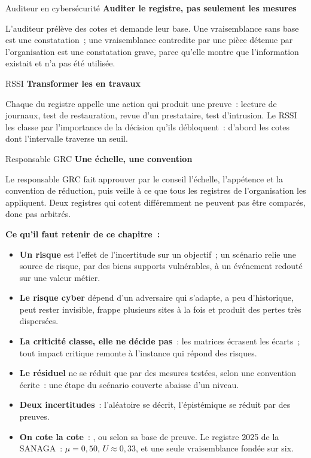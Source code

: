 \begin{boxmetier}{Auditeur en cybersécurité}
\textbf{Auditer le registre, pas seulement les mesures}

L'auditeur prélève des cotes et demande leur base. Une vraisemblance sans
base est une constatation~; une vraisemblance contredite par une pièce
détenue par l'organisation est une constatation grave, parce qu'elle
montre que l'information existait et n'a pas été utilisée.
\end{boxmetier}

\begin{boxmetier}{RSSI}
\textbf{Transformer les \NEK{} en travaux}

Chaque \NEK{} du registre appelle une action qui produit une preuve~:
lecture de journaux, test de restauration, revue d'un prestataire, test
d'intrusion. Le RSSI les classe par l'importance de la décision qu'ils
débloquent~: d'abord les cotes dont l'intervalle traverse un seuil.
\end{boxmetier}

\begin{boxmetier}{Responsable GRC}
\textbf{Une échelle, une convention}

Le responsable GRC fait approuver par le conseil l'échelle, l'appétence et
la convention de réduction, puis veille à ce que tous les registres de
l'organisation les appliquent. Deux registres qui cotent différemment ne
peuvent pas être comparés, donc pas arbitrés.
\end{boxmetier}

\separateur

\begin{boxresume}
\textbf{Ce qu'il faut retenir de ce chapitre~:}
\begin{itemize}
    \item \textbf{Un risque} est l'effet de l'incertitude sur un objectif~;
          un scénario relie une source de risque, par des biens supports
          vulnérables, à un événement redouté sur une valeur métier.
    \item \textbf{Le risque cyber} dépend d'un adversaire qui s'adapte, a
          peu d'historique, peut rester invisible, frappe plusieurs sites à
          la fois et produit des pertes très dispersées.
    \item \textbf{La criticité classe, elle ne décide pas}~: les matrices
          écrasent les écarts~; tout impact critique remonte à l'instance
          qui répond des risques.
    \item \textbf{Le résiduel} ne se réduit que par des mesures testées,
          selon une convention écrite~: une étape du scénario couverte
          abaisse d'un niveau.
    \item \textbf{Deux incertitudes}~: l'aléatoire se décrit, l'épistémique
          se réduit par des preuves.
    \item \textbf{On cote la cote}~: \OUI{}, \NON{} ou \NEK{} selon sa base
          de preuve. Le registre 2025 de la SANAGA~: $\mu = 0{,}50$,
          $U \approx 0{,}33$, et une seule vraisemblance fondée sur six.
\end{itemize}
\end{boxresume}

